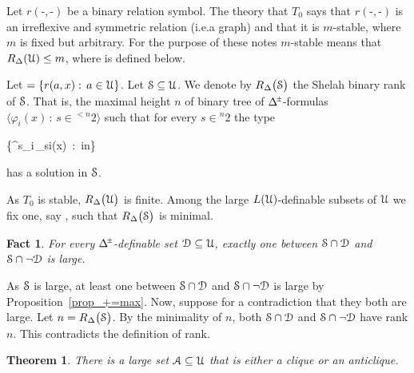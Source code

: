 \documentclass[10pt,oneside, openany]{book}
\renewcommand*{\emph}[1]{%
   \smash{\tikz[baseline]\node[rectangle, fill=green!40, rounded corners, inner xsep=0.5ex, inner ysep=0.2ex, anchor=base, minimum height = 2.7ex]{#1};}}
\def\pmDelta{\Delta\hskip-.3ex\raisebox{1ex}{\tiny$\pm$}}
\def\D{\EuScript D}
\def\Aa{\EuScript A}
\def\U{\EuScript U}
\def\S{\EuScript S}
\def\<{\langle}
\def\>{\rangle}
\def\phi{\varphi}
\newcounter{thm}[chapter]
\theoremstyle{mio}
\newtheorem{theorem}[thm]{Theorem}
\newtheorem{fact}[thm]{Fact}
\theoremstyle{liscio}
\def\QED{\noindent\nolinebreak[4]\hfill\rlap{\ \ $\Box$}\medskip}
\renewenvironment{proof}[1][Proof]%
{\smallskip\begin{trivlist}\item[\hskip\labelsep {\bf #1}]}
{\QED\end{trivlist}}
\begin{document}
Let $r(\mbox{-},\mbox{-})$ be a binary relation symbol.
%
The theory that $T_0$ says that $r(\mbox{-},\mbox{-})$ is an irreflexive and symmetric relation (i.e.\@ a graph) and that it is $m$-stable, where $m$ is fixed but arbitrary.
For the purpose of these notes $m$-stable means that $R_\Delta(\U)\le m$, where \emph{$R_\Delta$\/} is defined below.

Let \emph{$\Delta$} $=\{r(a,x) :\, a\in\U\}$.
%
Let $\S\subseteq\U$.
%
We denote by $R_\Delta\big(\S\big)$ the Shelah binary rank of $\S$.
%
That is, the maximal height $n$ of binary tree of $\pmDelta$-formulas $\<\phi_i(x)\,:\, s\in {}^{<n}2\>$ such that for every $s\in {}^{n}2$ the type 

\ceq{\hfill }
{}
{\big\{\neg^{s_i}\,\phi_{s\restriction i}(x)\, :\, i\le n\big\}}

has a solution in $\S$.

As $T_0$ is stable, $R_\Delta\big(\U\big)$ is finite.
%
Among the large $L(\U)$-definable subsets of $\U$ we fix one, say \emph{$\S=\sigma(\U)$}, such that $R_\Delta\big(\S\big)$ is minimal.

\begin{fact}
  For every $\pmDelta$-definable set $\D\subseteq\U$, exactly one between $\S\cap\D$ and $\S\cap\neg\D$ is large.
\end{fact}

\begin{proof}
  As $\S$ is large, at least one between $\S\cap\D$ and $\S\cap\neg\D$ is large by Proposition~\ref{prop_+=max}.
  Now, suppose for a contradiction that they both are large.
  Let $n=R_\Delta\big(\S\big)$.
  By the minimality of $n$, both $\S\cap\D$ and $\S\cap\neg\D$ have rank $n$.
  This contradicts the definition of rank.
\end{proof}

\begin{theorem}
  There is a large set $\Aa\subseteq\U$ that is either a clique or an anticlique.
\end{theorem}
\end{document}
